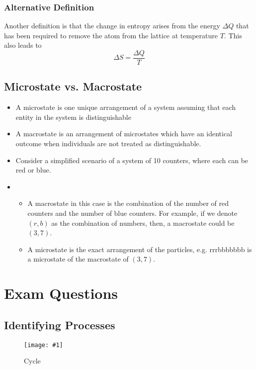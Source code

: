 \documentclass[a4paper,12pt]{article}
\let\oldsection\section
\renewcommand\section{\clearpage\oldsection}
\newcommand{\img}[4]{\begin{center}
  \begin{figure}[H]
    \centering
    \texttt{[image: \#1]}
    \caption{#3}
    \label{fig:#4}
  \end{figure}
\end{center}}
\begin{document}
\pagebreak

\subsubsection{Alternative Definition}

Another definition is that the change in entropy arises from the energy $\Delta Q$ that has been required to remove the atom from the lattice at temperature $T$. This also leads to
$$
  \Delta S = \dfrac{\Delta Q}{T}
$$

\pagebreak

\subsection{Microstate vs. Macrostate}

\begin{itemize}
  \item A microstate is one unique arrangement of a system assuming that each entity in the system is distinguishable
  \item A macrostate is an arrangement of microstates which have an identical outcome when individuals are not treated as distinguishable.
  \item Consider a simplified scenario of a system of 10 counters, where each can be red or blue.
  \item \begin{itemize}
          \item A macrostate in this case is the combination of the number of red counters and the number of blue counters. For example, if we denote $(r, b)$ as the combination of numbers, then, a macrostate could be $(3, 7)$.
          \item A microstate is the exact arrangement of the particles, e.g. rrrbbbbbbb is a microstate of the macrostate of $(3, 7)$.
        \end{itemize}
\end{itemize}

\section{Exam Questions}

\subsection{Identifying Processes}

\img{ex/1.png}{0.3}{Cycle}{ex1}
\end{document}
